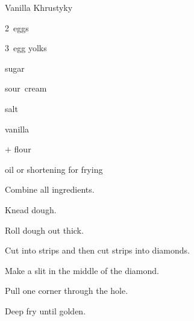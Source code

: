\begin{recipe}{Vanilla Khrustyky}{}{}

\begin{ingredients}
\item 2~eggs
\item 3~egg yolks
\item {} sugar
\item {} sour~cream
\item \tp{\half} salt
\item {} vanilla
\item {}$+$ flour
\item oil or shortening for frying
\end{ingredients}

\begin{directions}
\item Combine all ingredients.
\item Knead dough.
\item Roll dough out \inch{\eighth} thick.
\item Cut into strips and then cut strips into diamonds.
\item Make a slit in the middle of the diamond.
\item Pull one corner through the hole.
\item Deep fry until golden.
\end{directions}

\end{recipe}
